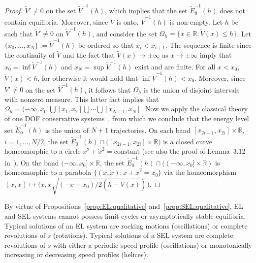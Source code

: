 \begin{proof}
	
	$\tilde V' \neq 0$ on the set $\tilde V^{-1}(h)$, which implies that
	the set $\tilde E_0^{-1}(h)$ does not contain equilibria.  Moreover,
	since $\tilde V$ is onto, $\tilde V^{-1}(h)$ is non-empty. Let $h$ be
	such that $\tilde V'\neq 0$ on $\tilde V^{-1}(h)$, and consider the
	set $\Omega_h=\{x\in\mathbb{R}: \tilde V(x) \leq h\}$.  Let
	$\{x_0,\ldots,x_N\}:=\tilde V^{-1}(h)$ be ordered so that $x_i <
	x_{i+1}$.  The sequence is finite since the continuity of $\tilde V$
	and the fact that $\tilde V(x) \to \pm\infty$ as $x \to \pm\infty$
	imply that $x_0 = \inf \tilde V^{-1}(h)$ and $x_N = \sup \tilde
	V^{-1}(h)$ exist and are finite. For all $x < x_0$, $\tilde V(x) < h$, for
	otherwise it would hold that $\inf \tilde V^{-1}(h) < x_0$. Moreover,
	since $\tilde V' \neq 0$ on the set $\tilde V^{-1}(h)$, it follows
	that $\Omega_h$ is the union of disjoint intervals with nonzero
	measure. This latter fact implies that $\Omega_h = (-\infty,x_0]
	\bigcup [x_1,x_2] \bigcup \cdots \bigcup [x_{N-1},x_N]$.  Now we
	apply the classical theory of one DOF conservative
	systems~\cite{ArnoldClassicalMech}, from which we conclude that the
	energy level set $\tilde E_0^{-1}(h)$ is the union of $N+1$
	trajectories. On each band $[x_{2i-1}, x_{2i}] \times \mathbb{R}$,
	$i=1,\ldots, N/2$, the set $\tilde E_0^{-1}(h) \cap \big( [x_{2i-1},
	x_{2i}] \times \mathbb{R}\big)$ is a closed curve homeomorphic to a
	circle $x^2 + \dot x^2 =\text{constant}$ (see also the proof of
	Lemma~3.12 in~\cite{Consolini-2010}). On the band $(-\infty,x_0]
	\times \mathbb{R}$, the set $\tilde E_0^{-1}(h) \cap ((-\infty,x_0]
	\times \mathbb{R})$ is homeomorphic to a parabola $\{(x,\dot x): x+\dot
	x^2=x_0\}$ via the homeomorphism $(x,\dot x) \mapsto \big( x,
	\dot x \sqrt{(-x+x_0)/{2( h - \tilde V(x))}}
	\big)$. \qquad\end{proof}

\begin{remark}
	By virtue of Propositions~\ref{prop:EL:qualitative}
	and~\ref{prop:SEL:qualitative}, EL and SEL systems cannot possess
	limit cycles or asymptotically stable equilibria. Typical solutions of
	an EL system are rocking motions (oscillations) or complete
	revolutions of $s$ (rotations). Typical solutions of a SEL system are
	complete revolutions of $s$ with either a periodic speed profile
	(oscillations) or monotonically increasing or decreasing speed profiles (helices).
\end{remark}

